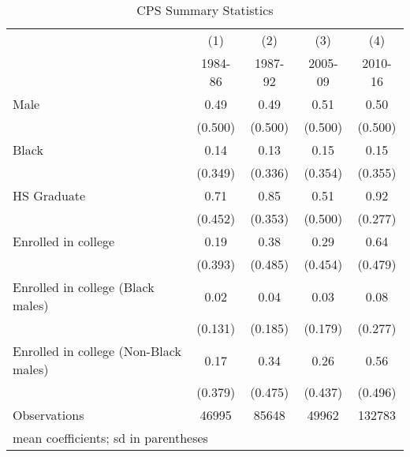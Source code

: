 \begin{table}[htbp]\centering
\caption{CPS Summary Statistics }
\begin{tabular}{l*{4}{c}}
\hline\hline
                    &\multicolumn{1}{c}{(1)}&\multicolumn{1}{c}{(2)}&\multicolumn{1}{c}{(3)}&\multicolumn{1}{c}{(4)}\\
                    &\multicolumn{1}{c}{1984-86}&\multicolumn{1}{c}{1987-92}&\multicolumn{1}{c}{2005-09}&\multicolumn{1}{c}{2010-16}\\
\hline
Male                &        0.49&        0.49&        0.51&        0.50\\
                    &     (0.500)&     (0.500)&     (0.500)&     (0.500)\\
[1em]
Black               &        0.14&        0.13&        0.15&        0.15\\
                    &     (0.349)&     (0.336)&     (0.354)&     (0.355)\\
[1em]
HS Graduate         &        0.71&        0.85&        0.51&        0.92\\
                    &     (0.452)&     (0.353)&     (0.500)&     (0.277)\\
[1em]
Enrolled in college &        0.19&        0.38&        0.29&        0.64\\
                    &     (0.393)&     (0.485)&     (0.454)&     (0.479)\\
[1em]
Enrolled in college (Black males)&        0.02&        0.04&        0.03&        0.08\\
                    &     (0.131)&     (0.185)&     (0.179)&     (0.277)\\
[1em]
Enrolled in college (Non-Black males)&        0.17&        0.34&        0.26&        0.56\\
                    &     (0.379)&     (0.475)&     (0.437)&     (0.496)\\
\hline
Observations        &       46995&       85648&       49962&      132783\\
\hline\hline
\multicolumn{5}{l}{\footnotesize mean coefficients; sd in parentheses}\\
\end{tabular}
\end{table}
